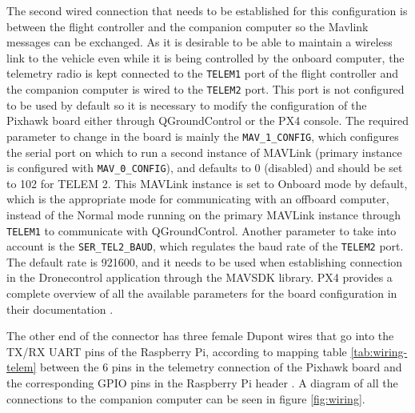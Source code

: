 The second wired connection that needs to be established for this configuration is between the flight controller and the companion computer so the Mavlink messages can be exchanged.
As it is desirable to be able to maintain a wireless link to the vehicle even while it is being controlled by the onboard computer, the telemetry radio is kept connected to the \texttt{TELEM1} port of the flight controller and the companion computer is wired to the \texttt{TELEM2} port.
This port is not configured to be used by default so it is necessary to modify the configuration of the Pixhawk board either through QGroundControl or the PX4 console.
The required parameter to change in the board is mainly the \texttt{MAV\_1\_CONFIG}, which configures the serial port on which to run a second instance of MAVLink (primary instance is configured with \texttt{MAV\_0\_CONFIG}), and defaults to 0 (disabled) and should be set to 102 for TELEM 2.
This MAVLink instance is set to Onboard mode by default, which is the appropriate mode for communicating with an offboard computer, instead of the Normal mode running on the primary MAVLink instance through \texttt{TELEM1} to communicate with QGroundControl.
Another parameter to take into account is the \texttt{SER\_TEL2\_BAUD}, which regulates the baud rate of the \texttt{TELEM2} port.
The default rate is 921600, and it needs to be used when establishing connection in the Dronecontrol application through the MAVSDK library.
PX4 provides a complete overview of all the available parameters for the board configuration in their documentation \cite{px4-docs-params}.



The other end of the connector has three female Dupont wires that go into the TX/RX UART pins of the Raspberry Pi,
according to mapping table \ref{tab:wiring-telem} between the 6 pins in the telemetry connection of the Pixhawk board and the corresponding GPIO pins in the Raspberry Pi header \cite{pixhawk-manual} \cite{pixhawk-px4}.
A diagram of all the connections to the companion computer can be seen in figure \ref{fig:wiring}.

